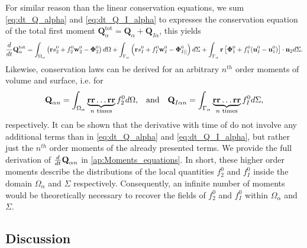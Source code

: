 For similar reason than the linear conservation equations, we sum \ref{eq:dt_Q_alpha} and \ref{eq:dt_Q_I_alpha} to expresses the conservation equation of the total first moment $\textbf{Q}_\alpha^\text{tot} = \textbf{Q}_\alpha + \textbf{Q}_{I\alpha}$, this yields 
\begin{multline}
    \frac{d}{d t} {\textbf{Q}_\alpha^\text{tot}}
    = \int_{\Omega_\alpha}  \left(
        \textbf{r} s_2^0         
        + f_2^0  \textbf{w}_2^0 
        - \mathbf{\Phi}_2^0
    \right)  d\Omega
    + \int_{\Gamma_\alpha}  \left(
        \textbf{r}s_I^0
        + f_I^0 \textbf{w}_I^0
        - \mathbf{\Phi}_{I||}^0
    \right)  d\Sigma
    + \int_{\Gamma_\alpha}  \textbf{r} \left[
        \mathbf{\Phi}_1^0
        + f_1^0 (\textbf{u}_I^0-\textbf{u}_1^0)
    \right]\cdot \textbf{n}_2   d\Sigma. 
    \label{eq:dt_Q_alpha_tot}
\end{multline}
Likewise, conservation laws can be derived for an arbitrary $n^{th}$ order moments of volume and surface, i.e. for
\begin{align}
    \textbf{Q}_{\alpha n}
    = \int_{\Omega_\alpha} 
         \underbrace{\textbf{rr}\ldots \textbf{rr}}_{n\text{ times}}
        f_2^0  d\Omega,
        && \text{and} &&
    \textbf{Q}_{I\alpha n}
    = \int_{\Gamma_\alpha} 
         \underbrace{\textbf{rr}\ldots \textbf{rr}}_{n\text{ times}}
    f_I^0  d\Sigma,
    \label{eq:Q_n_definition}
\end{align} 
respectively. 
It can be shown that the derivative with time of do not involve any additional terms than in \ref{eq:dt_Q_alpha} and \ref{eq:dt_Q_I_alpha}, but rather just the $n^{th}$ order moments of the already presented terms.
We provide the full derivation of $\frac{d}{d t}{ \textbf{Q}_{\alpha n}}$ in \ref{ap:Moments_equations}.
In short, these higher order moments describe the distributions of the local quantities $f_2^0$ and $f_I^0$ inside the domain $\Omega_\alpha$ and $\Sigma$ respectively.
Consequently, an infinite number of moments would be theoretically necessary to recover the fields of $f_2^0$ and $f_I^0$  within $\Omega_\alpha$ and $\Sigma$. 


\subsection{Discussion}


